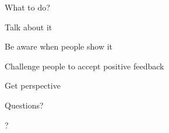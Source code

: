 \documentclass[aspectratio=169]{beamer}
\begin{document}
\begin{frame}
  \begin{center}
    \Huge What to do?
  \end{center}
\end{frame}

\begin{frame}
  \begin{center}
    \Huge Talk about it
  \end{center}
\end{frame}

\begin{frame}
  \begin{center}
    \Huge Be aware when people show it
  \end{center}
\end{frame}

\begin{frame}
  \begin{center}
    \Huge Challenge people to accept positive feedback
  \end{center}
\end{frame}

\begin{frame}
  \begin{center}
    \Huge Get perspective
  \end{center}
\end{frame}

\begin{frame}
  \begin{center}
    \Huge Questions?
  \end{center}
\end{frame}

\begin{frame}
 

  
\end{frame}

?
\end{document}
